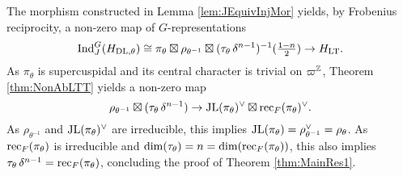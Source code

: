 \documentclass[../main.tex]{subfiles}
\begin{document}
The morphism constructed in Lemma \ref{lem:JEquivInjMor} yields, by Frobenius
reciprocity, a non-zero map of $G$-representations
\begin{equation} \label{eq:WantedMap}
  \mathrm{Ind}_{J}^G (H_{\mathrm{DL},\theta}) \cong \pi_\theta \boxtimes \rho_{\theta^{-1}}
  \boxtimes (\tau_\theta \, \delta^{n-1})^{-1}(\tfrac{1-n}2) \to H_{\mathrm{LT}}.
\end{equation}
As $\pi_\theta$ is supercuspidal and its central character is trivial on 
$\varpi^{\mathbb{Z}}$, Theorem \ref{thm:NonAbLTT} yields a non-zero map
\begin{equation*}
  \rho_{\theta^{-1}} \boxtimes (\tau_\theta \, \delta^{n-1}) \to
  \mathrm{JL}(\pi_\theta)^\vee \boxtimes \mathrm{rec}_F(\pi_\theta)^\vee.
\end{equation*}
As $\rho_{\theta^{-1}}$ and $\mathrm{JL}(\pi_\theta)^\vee$ are irreducible, this implies
$\mathrm{JL}(\pi_\theta) = \rho_{\theta^{-1}}^\vee = \rho_\theta$. As 
$\mathrm{rec}_F(\pi_\theta)$ is irreducible and $\dim(\tau_\theta) = n = \dim
(\mathrm{rec}_F(\pi_\theta))$, this also implies $\tau_\theta \, \delta^{n-1} =
\mathrm{rec}_F(\pi_\theta)$, concluding the proof of Theorem \ref{thm:MainRes1}.


\end{document}
